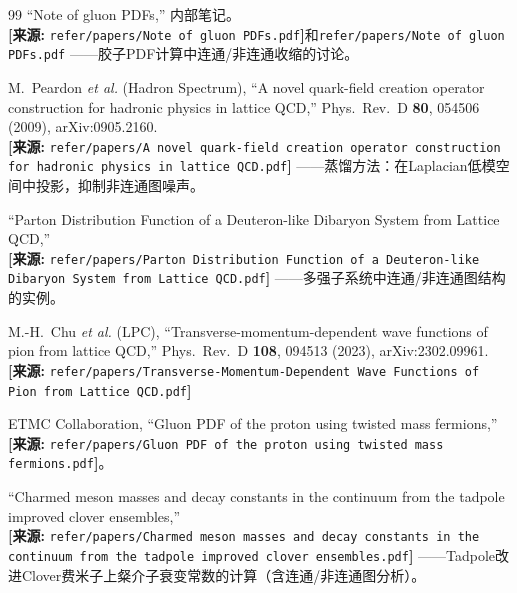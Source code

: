 \documentclass[12pt,a4paper]{ctexart}
\theoremstyle{definition}
\begin{document}
\begin{thebibliography}{99}
``Note of gluon PDFs,'' 内部笔记。
\\\textbf{[来源:} \texttt{refer/papers/Note of gluon PDFs.pdf}\textbf{]}和\texttt{refer/papers/Note of gluon PDFs.pdf}
——胶子PDF计算中连通/非连通收缩的讨论。

M.~Peardon \textit{et al.} (Hadron Spectrum),
``A novel quark-field creation operator construction for hadronic physics in lattice QCD,''
Phys.\ Rev.\ D \textbf{80}, 054506 (2009), arXiv:0905.2160.
\\\textbf{[来源:} \texttt{refer/papers/A novel quark-field creation operator construction for hadronic physics in lattice QCD.pdf}\textbf{]}
——蒸馏方法：在Laplacian低模空间中投影，抑制非连通图噪声。

``Parton Distribution Function of a Deuteron-like Dibaryon System from Lattice QCD,''
\\\textbf{[来源:} \texttt{refer/papers/Parton Distribution Function of a Deuteron-like Dibaryon System from Lattice QCD.pdf}\textbf{]}
——多强子系统中连通/非连通图结构的实例。

M.-H.~Chu \textit{et al.} (LPC),
``Transverse-momentum-dependent wave functions of pion from lattice QCD,''
Phys.\ Rev.\ D \textbf{108}, 094513 (2023), arXiv:2302.09961.
\\\textbf{[来源:} \texttt{refer/papers/Transverse-Momentum-Dependent Wave Functions of Pion from Lattice QCD.pdf}\textbf{]}

ETMC Collaboration,
``Gluon PDF of the proton using twisted mass fermions,''
\\\textbf{[来源:} \texttt{refer/papers/Gluon PDF of the proton using twisted mass fermions.pdf}\textbf{]}。

``Charmed meson masses and decay constants in the continuum from the tadpole improved clover ensembles,''
\\\textbf{[来源:} \texttt{refer/papers/Charmed meson masses and decay constants in the continuum from the tadpole improved clover ensembles.pdf}\textbf{]}
——Tadpole改进Clover费米子上粲介子衰变常数的计算（含连通/非连通图分析）。

\end{thebibliography}
\end{document}

